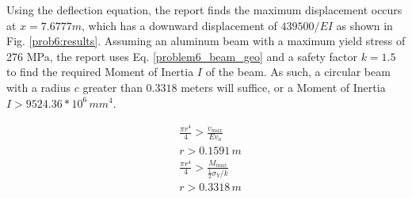 \documentclass[a4paper]{article}
\begin{document}
Using the deflection equation, the report finds the maximum displacement occurs at $x = 7.6777 m$, which has a downward displacement of $439500/EI$ as shown in Fig. \ref{prob6:results}. Assuming an aluminum beam with a maximum yield stress of 276 MPa, the report uses Eq. \ref{problem6_beam_geo} and a safety factor $k=1.5$ to find the required Moment of Inertia $I$ of the beam. As such, a circular beam with a radius $c$ greater than $0.3318$ meters will suffice, or a Moment of Inertia $I > 9524.36 * 10^6\,{mm}^4$.

\begin{equation}
\begin{split}
& \frac{\pi r^4}{4} > \frac{v_{max}}{Ev_a} \\
& r > 0.1591\,m \\
& \frac{\pi r^4}{4} > \frac{M_{max}}{\frac{1}{2}\sigma_Y/ k}\\
& r > 0.3318\,m \\
\end{split}
\label{problem6_beam_geo}
\end{equation}
\end{document}
